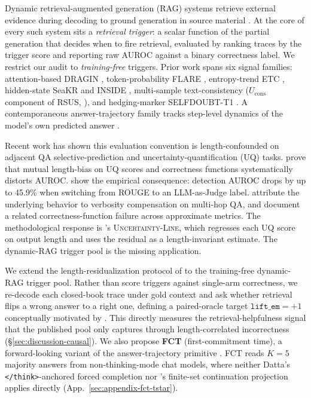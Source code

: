 \documentclass[11pt]{article}
\begin{document}
Dynamic retrieval-augmented generation (RAG) systems retrieve external evidence during decoding to ground generation in source material \citep{lewis_retrieval-augmented_2021, trivedi_interleaving_2023, shao_enhancing_2023}. At the core of every such system sits a \emph{retrieval trigger}: a scalar function of the partial generation that decides when to fire retrieval, evaluated by ranking traces by the trigger score and reporting raw AUROC against a binary correctness label. We restrict our audit to \emph{training-free} triggers. Prior work spans six signal families: attention-based DRAGIN \citep{su_dragin_2024}, token-probability FLARE \citep{jiang_active_2023}, entropy-trend ETC \citep{li_modeling_2026}, hidden-state SeaKR \citep{yao_seakr_2025} and INSIDE \citep{chen_inside_2024}, multi-sample text-consistency ($U_{\text{cons}}$ component of RSUS, \citealp{guo_when_2026}), and hedging-marker SELFDOUBT-T1 \citep{pandey_selfdoubt_2026}. A contemporaneous answer-trajectory family tracks step-level dynamics of the model's own predicted answer \citep{datta_large_2026, wang_chain--probe_2025, chen_i_2026}. 

Recent work has shown this evaluation convention is length-confounded on adjacent QA selective-prediction and uncertainty-quantification (UQ) tasks. \citet{santilli_revisiting_2025} prove that mutual length-bias on UQ scores and correctness functions systematically distorts AUROC. \citet{janiak_illusion_2025} show the empirical consequence: detection AUROC drops by up to 45.9\% when switching from ROUGE to an LLM-as-Judge label. \citet{zhang_verbosity_2024} attribute the underlying behavior to verbosity compensation on multi-hop QA, and \citet{ielanskyi_addressing_2025} document a related correctness-function failure across approximate metrics. The methodological response is \citet{vashurin_uncertainty-line_2025}'s \textsc{Uncertainty-Line}, which regresses each UQ score on output length and uses the residual as a length-invariant estimate. The dynamic-RAG trigger pool is the missing application.

We extend the length-residualization protocol of \citet{vashurin_uncertainty-line_2025} to the training-free dynamic-RAG trigger pool. Rather than score triggers against single-arm correctness, we re-decode each closed-book trace under gold context and ask whether retrieval flips a wrong answer to a right one, defining a paired-oracle target $\texttt{lift\_em}{=}+1$ conceptually motivated by \citet{mallen_when_2023}. This directly measures the retrieval-helpfulness signal that the published pool only captures through length-correlated incorrectness (\S\ref{sec:discussion-causal}). We also propose \textbf{FCT} (first-commitment time), a forward-looking variant of the answer-trajectory primitive \citep{datta_large_2026, wang_chain--probe_2025, chen_i_2026, zhang_when_2026}. FCT reads $K{=}5$ majority answers from non-thinking-mode chat models, where neither Datta's \texttt{</think>}-anchored forced completion nor \citeauthor{zhang_when_2026}'s finite-set continuation projection applies directly (App.~\ref{sec:appendix-fct-tstar}).
\end{document}
